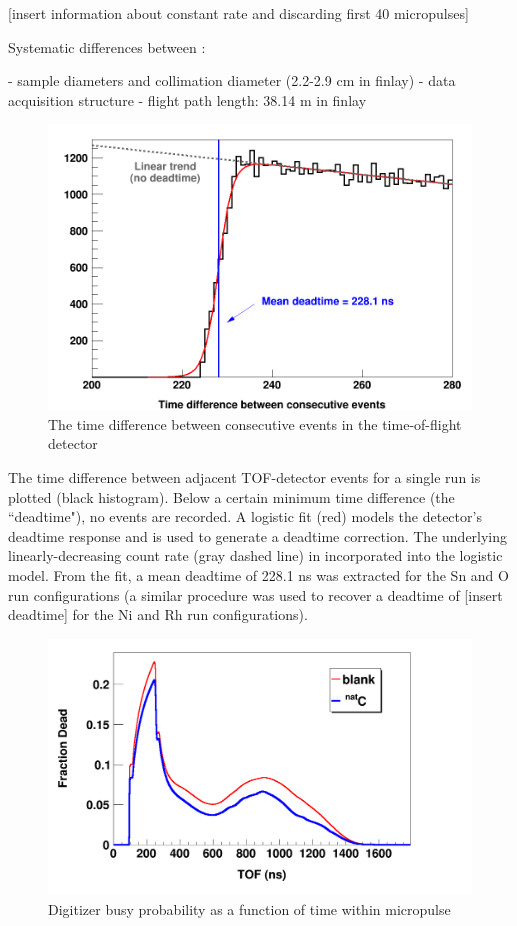 [insert information about constant rate and discarding first 40 micropulses]

Systematic differences between \cite{Shane2010, Finlay1993, Abfalterer2001}:

- sample diameters and collimation diameter (2.2-2.9 cm in finlay)
- data acquisition structure
- flight path length: 38.14 m in finlay

\begin{figure}
    \includegraphics[scale=0.24]{figures/TimeDifferenceBetweenEvents.png}
    \caption{The time difference between consecutive events in the time-of-flight detector}
    \label{TimeDifferenceBetweenEvents}
\end{figure}

The time difference between adjacent TOF-detector
    events for a single run is plotted (black histogram). Below a certain
minimum time difference (the ``deadtime"), no events are recorded. A logistic
fit (red) models the detector's deadtime response and is used to generate a
deadtime correction. The underlying linearly-decreasing count rate (gray dashed
line) in incorporated into the logistic model. From the fit, a mean deadtime of
228.1 ns was extracted for the Sn and O run configurations (a similar
procedure was used to recover a deadtime of [insert deadtime] for the Ni and Rh
run configurations).

\begin{figure}
    \includegraphics[scale=0.3]{figures/exampleDeadtimeSpectrum.png}
    \caption{Digitizer busy probability as a function of time within micropulse}
    \label{ExampleDeadtimeSpectrum}
\end{figure}

